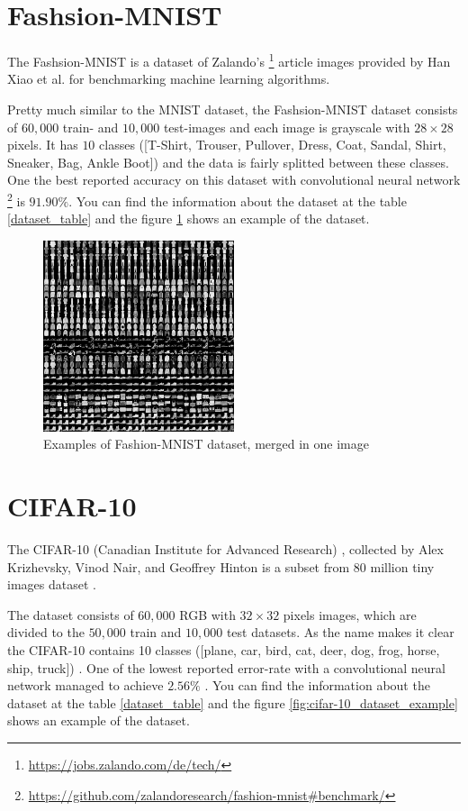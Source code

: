 \section{Fashsion-MNIST}
The Fashsion-MNIST is a dataset of Zalando's \footnote{\url{https://jobs.zalando.com/de/tech/}}
article images provided by Han Xiao et al. \cite{Fashion_MNIST_reference} for benchmarking machine learning algorithms.

Pretty much similar to the MNIST dataset, the Fashsion-MNIST dataset consists of $60,000$ train- and $10,000$ test-images and each image is grayscale
with $28 \times 28$ pixels. It has $10$ classes ([T-Shirt, Trouser, Pullover, Dress, Coat,
    Sandal, Shirt, Sneaker, Bag, Ankle Boot]) and the data is fairly
splitted between these classes. One the best reported accuracy on this dataset with convolutional neural
network \footnote{\url{https://github.com/zalandoresearch/fashion-mnist\#benchmark/}} is $91.90\%$. You can
find the information about the dataset at the table
\ref{dataset_table} and the figure \ref{fig:fashion_mnist_dataset_example} shows an example of the dataset.


\begin{figure}
  \centering
  \label{fig:fashion_mnist_dataset_example}
  \includegraphics[width=0.5\textwidth]{fig/fashion-mnist-dataset_example}
  \caption{Examples of Fashion-MNIST dataset, merged in one image}
\end{figure}

\section{CIFAR-10}
The CIFAR-10 (Canadian Institute for Advanced Research)
, collected by Alex Krizhevsky, Vinod Nair, and Geoffrey Hinton is a subset from 80 million tiny
images dataset \cite{CIFAR-10_origin_dataset}.

The dataset consists of $60,000$  RGB with $32 \times 32$ pixels images, which are divided to the $50,000$ train and $10,000$ test datasets. As the name makes it clear the CIFAR-10 contains 10 classes ([plane, car, bird, cat, deer, dog, frog, horse, ship, truck]) \cite{CIFAR-10_dataset_reference}.
One of the lowest reported error-rate with a convolutional neural network managed to achieve $2.56\%$ \cite{CIFAR-10_best_result_reference}.  You can
find the information about the dataset at the table
\ref{dataset_table} and the figure \ref{fig:cifar-10_dataset_example} shows an example of the dataset.

